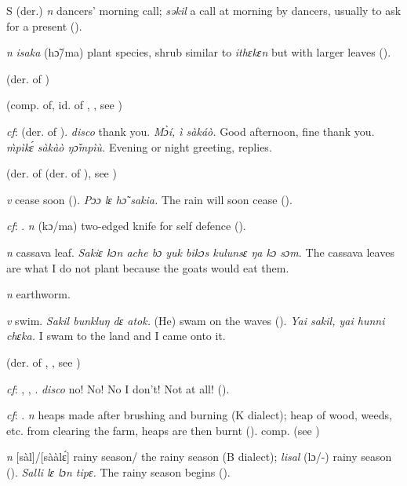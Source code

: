 \begin{letter}{S}
 (der.) \textit{n} dancers' morning call; \textit{səkil} a call at morning by dancers, usually to ask for a present (\citealt{Pichl1967}).

 \textit{n} \textit{isaka} (hɔ̃/ma) plant species, shrub similar to \textit{ithɛkɛn} but with larger leaves (\citealt{Pichl1967}). 

 (der. of ) 

 (comp. of, id. of , , see )

 \textit{cf}:  (der. of ). \textit{disco} thank you. \textit{Mɔ̀í, ì sàkáò.} Good afternoon, fine thank you. \textit{\`{m}pìkɛ́ sàkàò ŋɔ̌mpìù.} Evening or night greeting, replies.

 (der. of  (der. of ), see )

 \textit{v} cease soon (\citealt{Pichl1967}). \textit{Pɔɔ lɛ hɔ̃ sakia.} The rain will soon cease (\citealt{Pichl1967}). 

 \textit{cf}: . \textit{n} (kɔ/ma) two-edged knife for self defence (\citealt{Pichl1967}).

 \textit{n} cassava leaf. \textit{Sakiɛ kɔn ache bɔ yuk bikɔs kulunsɛ ŋa kɔ sɔm.} The cassava leaves are what I do not plant because the goats would eat them.

 \textit{n} earthworm.

 \textit{v} swim. \textit{Sakil bunkluŋ dɛ atok.} (He) swam on the waves (\citealt{Pichl1967}). \textit{Yai sakil, yai hunni chɛka.} I swam to the land and I came onto it.

 (der. of , , see ) 

 \textit{cf}: , , . \textit{disco} no! \textit{} No! No I don't! Not at all! (\citealt{Pichl1967}).

 \textit{cf}: . \textit{n} heaps made after brushing and burning (K dialect); heap of wood, weeds, etc. from clearing the farm, heaps are then burnt (\citealt{Pichl1967}). comp.  (see ) 

 \textit{n} [sàl]/[sààlɛ́] rainy season/ the rainy season (B dialect); \textit{lisal} (lɔ/-) rainy season (\citealt{Pichl1967}). \textit{Salli lɛ lɔn tipɛ.} The rainy season begins (\citealt{Pichl1967}). 


\end{letter}
